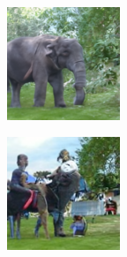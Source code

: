 \documentclass{article}
\begin{document}
\begin{figure}
    \begin{subfigure}[b]{0.5\linewidth}
        \begin{subfigure}[b]{0.242\linewidth}
        \includegraphics[width=\linewidth]{figures/imagenet128/solver_samples/imagenet128_fm_ot_52_05.png}
        \end{subfigure}%
        \begin{subfigure}[b]{0.242\linewidth}
        \includegraphics[width=\linewidth]{figures/imagenet128/solver_samples/imagenet128_fm_ot_52_10.png}

\end{subfigure}
\end{subfigure}
\end{figure}
\end{document}
